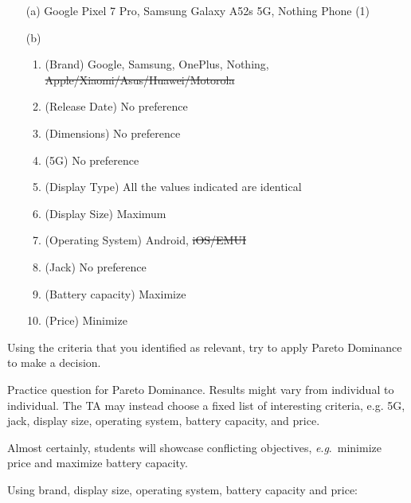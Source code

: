 \documentclass[10pt, UKenglish]{exam}
\begin{document}
\begin{questions}
\begin{solutionorbox}
		\begin{enumerate}
			\item[(a)] Google Pixel 7 Pro, Samsung Galaxy A52s 5G, Nothing Phone (1)
			\item [(b)] \begin{enumerate}
				\item (Brand) Google, Samsung, OnePlus, Nothing, \sout{Apple/Xiaomi/Asus/Huawei/Motorola}
				\item (Release Date) No preference
				\item (Dimensions) No preference
				\item (5G) No preference
				\item (Display Type) All the values indicated are identical
				\item (Display Size) Maximum
				\item (Operating System) Android, \sout{iOS/EMUI}
				\item (Jack) No preference
				\item (Battery capacity) Maximize
				\item (Price) Minimize
			\end{enumerate}
		\end{enumerate}
		
	\end{solutionorbox}
	
	\question\label{q:2}%
	Using the criteria that you identified as relevant, try to apply Pareto
	Dominance to make a decision.

	\begin{comments}
		Practice question for Pareto Dominance. Results might vary from
		individual to individual. The TA may instead choose a fixed
		list of  interesting criteria, e.g. 5G, jack, display size,
		operating system, battery capacity, and price.

		Almost certainly, students will showcase conflicting
		objectives, \textit{e}.\textit{g}.\ minimize price and maximize
		battery capacity.
	\end{comments}
	
	\begin{solutionorbox}
		Using brand, display size, operating system, battery capacity and price:


\end{solutionorbox}
\end{questions}
\end{document}
